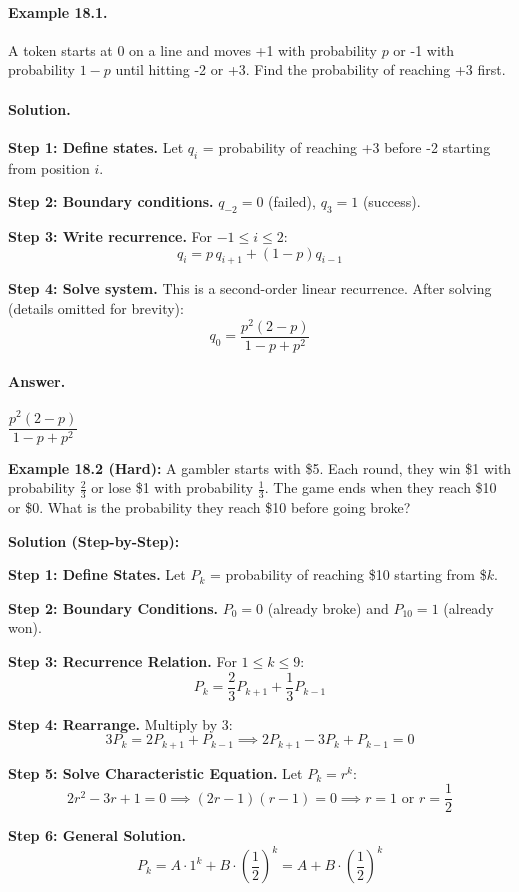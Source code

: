 \documentclass[12pt]{extarticle}
\begin{document}
\paragraph{Example 18.1.} A token starts at 0 on a line and moves +1 with probability $p$ or -1 with probability $1-p$ until hitting -2 or +3. Find the probability of reaching +3 first.

\paragraph{Solution.}
\textbf{Step 1: Define states.} Let $q_i$ = probability of reaching +3 before -2 starting from position $i$.

\textbf{Step 2: Boundary conditions.} $q_{-2}=0$ (failed), $q_3=1$ (success).

\textbf{Step 3: Write recurrence.} For $-1 \le i \le 2$:
\[
q_i = p\,q_{i+1} + (1-p)q_{i-1}
\]

\textbf{Step 4: Solve system.} This is a second-order linear recurrence. After solving (details omitted for brevity):
\[
q_0=\dfrac{p^2(2-p)}{1-p+p^2}
\]

\paragraph{Answer.} $\boxed{\dfrac{p^2(2-p)}{1-p+p^2}}$

\textbf{Example 18.2 (Hard):} A gambler starts with \$5. Each round, they win \$1 with probability $\frac{2}{3}$ or lose \$1 with probability $\frac{1}{3}$. The game ends when they reach \$10 or \$0. What is the probability they reach \$10 before going broke?

\textbf{Solution (Step-by-Step):}

\textbf{Step 1: Define States.} Let $P_k$ = probability of reaching \$10 starting from \$$k$.

\textbf{Step 2: Boundary Conditions.} 
$P_0 = 0$ (already broke) and $P_{10} = 1$ (already won).

\textbf{Step 3: Recurrence Relation.} For $1 \le k \le 9$:
\[
P_k = \frac{2}{3}P_{k+1} + \frac{1}{3}P_{k-1}
\]

\textbf{Step 4: Rearrange.} Multiply by 3:
\[
3P_k = 2P_{k+1} + P_{k-1} \implies 2P_{k+1} - 3P_k + P_{k-1} = 0
\]

\textbf{Step 5: Solve Characteristic Equation.} Let $P_k = r^k$:
\[
2r^2 - 3r + 1 = 0 \implies (2r-1)(r-1) = 0 \implies r = 1 \text{ or } r = \frac{1}{2}
\]

\textbf{Step 6: General Solution.}
\[
P_k = A \cdot 1^k + B \cdot \left(\frac{1}{2}\right)^k = A + B \cdot \left(\frac{1}{2}\right)^k
\]
\end{document}
